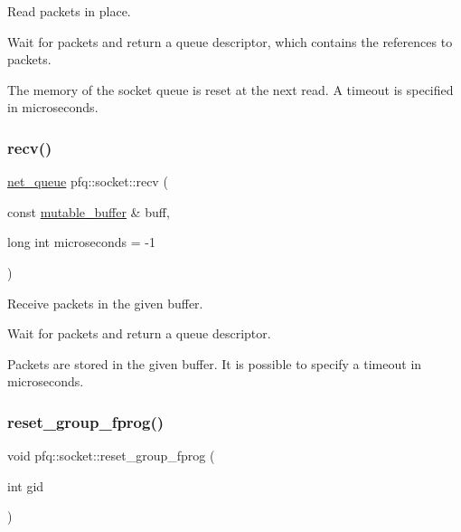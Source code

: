 Read packets in place. 

Wait for packets and return a \textquotesingle{}queue\textquotesingle{} descriptor, which contains the references to packets.

The memory of the socket queue is reset at the next read. A timeout is specified in microseconds. \mbox{\label{classpfq_1_1socket_a57643b9011269682bf716254c2b72907}} 
\subsubsection{\texorpdfstring{recv()}{recv()}}
{\footnotesize\ttfamily \hyperlink{classpfq_1_1net__queue}{net\+\_\+queue} pfq\+::socket\+::recv (\begin{DoxyParamCaption}\item[{const \hyperlink{namespacepfq_ad7b88920eaf729154354741132483ea8}{mutable\+\_\+buffer} \&}]{buff,  }\item[{long int}]{microseconds = {\ttfamily -\/1} }\end{DoxyParamCaption})\hspace{0.3cm}{\ttfamily [inline]}}



Receive packets in the given buffer. 

Wait for packets and return a queue descriptor.

Packets are stored in the given buffer. It is possible to specify a timeout in microseconds. \mbox{\label{classpfq_1_1socket_a2327e71a6f94e54efb0da5ec36b1c620}} 
\subsubsection{\texorpdfstring{reset\+\_\+group\+\_\+fprog()}{reset\_group\_fprog()}}
{\footnotesize\ttfamily void pfq\+::socket\+::reset\+\_\+group\+\_\+fprog (\begin{DoxyParamCaption}\item[{int}]{gid }\end{DoxyParamCaption})\hspace{0.3cm}{\ttfamily [inline]}}



